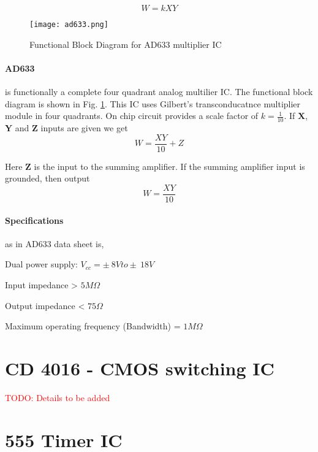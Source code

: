 \begin{equation}
W=kXY
\end{equation}

\begin{figure}[h]
\texttt{[image: ad633.png]}
\caption{Functional Block Diagram for AD633 multiplier IC}
\label{ad633}
\end{figure}

\paragraph{AD633} is functionally a complete four quadrant analog multilier IC. The functional block diagram is shown in Fig. \ref{ad633}. This IC uses Gilbert's transconducatnce multiplier module in four quadrants. On chip circuit provides a scale factor of $k=\frac{1}{10}$. If $\textbf{X}$, $\textbf{Y}$ and $\textbf{Z}$ inputs are given we get 
\begin{equation}
W=\frac{XY}{10}+Z
\end{equation}

Here $\textbf{Z}$ is the input to the summing amplifier. If the summing amplifier input is grounded, then output 
\begin{equation}
W=\frac{XY}{10}
\end{equation}

\paragraph{Specifications}as in AD633 data sheet is,

\noindent Dual power supply: $V_{cc}= \pm \ 8V to \pm \ 18V$

\noindent Input impedance > $5 M \Omega$

\noindent Output impedance < $75  \Omega$

\noindent Maximum operating frequency (Bandwidth) = $1 M\Omega$

\section{CD 4016 - CMOS switching IC}
\textcolor{red}{TODO: Details to be added}


\section{555 Timer IC}
\label{555}

